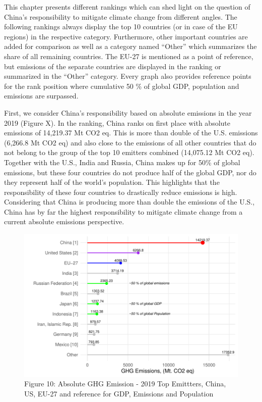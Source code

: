 \documentclass[
  12pt,
]{article}
\numberwithin{equation}{section}
\numberwithin{table}{section}
\numberwithin{figure}{section}
\begin{document}
This chapter presents different rankings which can shed light on the
question of China's responsibility to mitigate climate change from
different angles. The following rankings always display the top 10
countries (or in case of the EU regions) in the respective category.
Furthermore, other important countries are added for comparison as well
as a category named ``Other'' which summarizes the share of all
remaining countries. The EU-27 is mentioned as a point of reference, but
emissions of the separate countries are displayed in the ranking or
summarized in the ``Other'' category. Every graph also provides
reference points for the rank position where cumulative 50 \% of global
GDP, population and emissions are surpassed.

First, we consider China's responsibility based on absolute emissions in
the year 2019 (Figure X). In the ranking, China ranks on first place
with absolute emissions of 14,219.37 Mt CO2 eq. This is more than double
of the U.S. emissions (6,266.8 Mt CO2 eq) and also close to the
emissions of all other countries that do not belong to the group of the
top 10 emitters combined (14,075.12 Mt CO2 eq). Together with the U.S.,
India and Russia, China makes up for 50\% of global emissions, but these
four countries do not produce half of the global GDP, nor do they
represent half of the world's population. This highlights that the
responsibility of these four countries to drastically reduce emissions
is high. Considering that China is producing more than double the
emissions of the U.S., China has by far the highest responsibility to
mitigate climate change from a current absolute emissions perspective.

\begin{figure}
\centering
\includegraphics{Paper_files/figure-latex/unnamed-chunk-13-1.pdf}
\caption{Figure 10: Absolute GHG Emission - 2019 \textbar{} Top
Emittters, China, US, EU-27 and reference for GDP, Emissions and
Population}
\end{figure}
\end{document}
